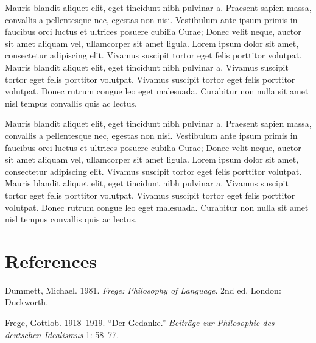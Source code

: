 \documentclass{scrbook}
\newlength{\cslhangindent}
\newlength{\cslentryspacingunit} %
\newenvironment{CSLReferences}[2] %
 {%
  \setlength{\parindent}{0pt}
  \ifodd #1
  \let\oldpar\par
  \def\par{\hangindent=\cslhangindent\oldpar}
  \fi
  \setlength{\parskip}{#2\cslentryspacingunit}
 }%
 {}
\begin{document}
Mauris blandit aliquet elit, eget tincidunt nibh pulvinar a. Praesent
sapien massa, convallis a pellentesque nec, egestas non nisi. Vestibulum
ante ipsum primis in faucibus orci luctus et ultrices posuere cubilia
Curae; Donec velit neque, auctor sit amet aliquam vel, ullamcorper sit
amet ligula. Lorem ipsum dolor sit amet, consectetur adipiscing elit.
Vivamus suscipit tortor eget felis porttitor volutpat. Mauris blandit
aliquet elit, eget tincidunt nibh pulvinar a. Vivamus suscipit tortor
eget felis porttitor volutpat. Vivamus suscipit tortor eget felis
porttitor volutpat. Donec rutrum congue leo eget malesuada. Curabitur
non nulla sit amet nisl tempus convallis quis ac lectus.

Mauris blandit aliquet elit, eget tincidunt nibh pulvinar a. Praesent
sapien massa, convallis a pellentesque nec, egestas non nisi. Vestibulum
ante ipsum primis in faucibus orci luctus et ultrices posuere cubilia
Curae; Donec velit neque, auctor sit amet aliquam vel, ullamcorper sit
amet ligula. Lorem ipsum dolor sit amet, consectetur adipiscing elit.
Vivamus suscipit tortor eget felis porttitor volutpat. Mauris blandit
aliquet elit, eget tincidunt nibh pulvinar a. Vivamus suscipit tortor
eget felis porttitor volutpat. Vivamus suscipit tortor eget felis
porttitor volutpat. Donec rutrum congue leo eget malesuada. Curabitur
non nulla sit amet nisl tempus convallis quis ac lectus.

\hypertarget{c3-c3-references}{%
\section*{References}\label{c3-c3-references}}

\hypertarget{c3-refs}{}
\begin{CSLReferences}{1}{0}
\leavevmode{}%
Dummett, Michael. 1981. \emph{Frege: Philosophy of Language}. 2nd ed.
{London}: {Duckworth}.

\leavevmode{}%
Frege, Gottlob. 1918--1919. {``Der Gedanke.''} \emph{Beiträge zur
Philosophie des deutschen Idealismus} 1: 58--77.

\end{CSLReferences}



\backmatter
\clearpage
\pagestyle{empty}


{\hypersetup{linkcolor=black}
}
\end{document}
